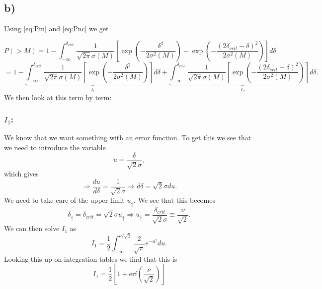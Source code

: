 \documentclass[a4paper,norsk, 10pt]{article}
\begin{document}
\subsection{b)}
Using \eqref{eq:Pm} and \eqref{eq:Pnc} we get

\begin{equation}\label{eq:Pm}
P(>M) = 1 - \int_{-\infty}^{\delta_{crit}} \frac{1}{\sqrt{2\pi}\sigma(M)}\left[\exp\left(-\frac{\delta^2}{2\sigma^2 (M)}\right)-\exp\left(-\frac{(2\delta_{crit} - \delta)^2}{2\sigma^2 (M)}\right)\right] d\delta
\end{equation}
\begin{equation}
= 1 - \underbrace{\int_{-\infty}^{\delta_{crit}} \frac{1}{\sqrt{2\pi}\sigma(M)}\left[\exp\left(-\frac{\delta^2}{2\sigma^2 (M)}\right)\right]d\delta}_{I_1}+\underbrace{\int_{-\infty}^{\delta_{crit}} \frac{1}{\sqrt{2\pi}\sigma(M)}\left[\exp\left(-\frac{(2\delta_{crit} - \delta)^2}{2\sigma^2 (M)}\right)\right] d\delta}_{I_2}.
\end{equation}
We then look at this term by term:
\subsubsection*{$I_1$:}
We know that we want something with an error function. To get this we see that we need to introduce the variable
\begin{equation}
u = \frac{\delta}{\sqrt{2}\sigma},
\end{equation}
which gives
\begin{equation}
\Rightarrow \frac{du}{d\delta} = \frac{1}{\sqrt{2}\sigma} \Rightarrow d\delta = \sqrt{2}\sigma du.
\end{equation}
We need to take care of the upper limit $u_{\uparrow}$. We see that this becomes
\begin{equation}
\delta_{\uparrow} = \delta_{crit} = \sqrt{2}\sigma u_{\uparrow} \Rightarrow u_{\uparrow} = \frac{\delta_{crit}}{\sqrt{2}\sigma} \equiv \frac{\nu}{\sqrt{2}}.
\end{equation}
We can then solve $I_1$ as
\begin{equation}
I_1 = \frac{1}{2}\int_{-\infty}^{\nu/\sqrt{2}} \frac{2}{\sqrt{\pi}}e^{-u^2} du.
\end{equation}
Looking this up on integration tables we find that this is
\begin{equation}
I_1 = \frac{1}{2}\left[1+\text{erf}\left(\frac{\nu}{\sqrt{2}}\right)\right]
\end{equation}
\end{document}
